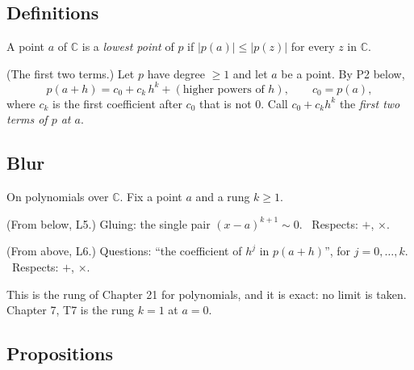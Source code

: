 \subsection*{Definitions}

\begin{lines}
\item[\lab{D1}] A point $a$ of $\mathbb{C}$ is a \emph{lowest point} of $p$ if $|p(a)| \le |p(z)|$ for every $z$ in $\mathbb{C}$.
\item[\lab{D2}] (The first two terms.) Let $p$ have degree $\ge 1$ and let $a$ be a point. By P2 below,
\[
p(a + h) = c_0 + c_k\,h^k + (\text{higher powers of } h), \qquad c_0 = p(a),
\]
where $c_k$ is the first coefficient after $c_0$ that is not $0$. Call $c_0 + c_k h^k$ the \emph{first two terms of $p$ at $a$}.
\end{lines}

\subsection*{Blur}

On polynomials over $\mathbb{C}$. Fix a point $a$ and a rung $k \ge 1$.

\begin{lines}
\item[\lab{B1}] (From below, L5.) Gluing: the single pair $(x - a)^{k+1} \sim 0$. \ Respects: $+$, $\times$.
\item[\lab{B2}] (From above, L6.) Questions: ``the coefficient of $h^j$ in $p(a + h)$'', for $j = 0, \dots, k$. \ Respects: $+$, $\times$.
\end{lines}

This is the rung of Chapter 21 for polynomials, and it is exact: no limit is taken. Chapter 7, T7 is the rung $k = 1$ at $a = 0$.

\subsection*{Propositions}

